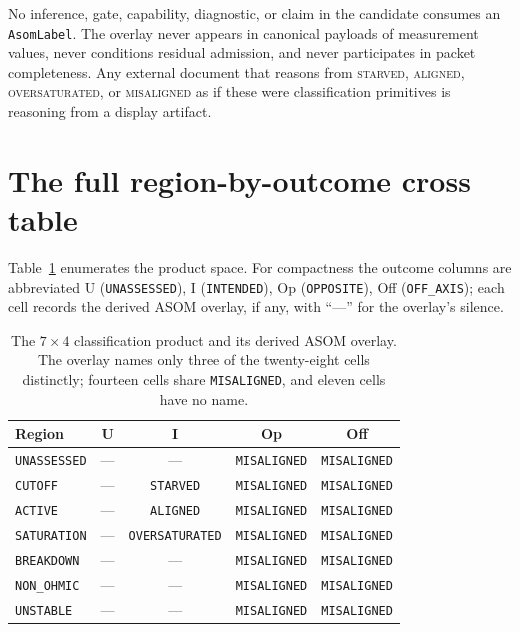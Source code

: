 \begin{ruleenv}\label{ch07:rule:asom-no-identity}
No inference, gate, capability, diagnostic, or claim in the candidate
consumes an \texttt{AsomLabel}. The overlay never appears in canonical
payloads of measurement values, never conditions residual admission, and
never participates in packet completeness. Any external document that
reasons from \textsc{starved}, \textsc{aligned}, \textsc{oversaturated}, or
\textsc{misaligned} as if these were classification primitives is reasoning
from a display artifact.
\end{ruleenv}

\section{The full region-by-outcome cross table}\label{ch07:sec:crosstable}

Table~\ref{ch07:tab:cross} enumerates the product space. For compactness
the outcome columns are abbreviated U (\texttt{UNASSESSED}),
I (\texttt{INTENDED}), Op (\texttt{OPPOSITE}), Off (\texttt{OFF\_AXIS});
each cell records the derived ASOM overlay, if any, with ``---'' for the
overlay's silence.

\begin{table}[htbp]
\centering
\begin{tabular}{@{}lcccc@{}}
\toprule
Region & U & I & Op & Off \\
\midrule
\texttt{UNASSESSED} & --- & --- & \texttt{MISALIGNED} & \texttt{MISALIGNED} \\
\texttt{CUTOFF} & --- & \texttt{STARVED} & \texttt{MISALIGNED} & \texttt{MISALIGNED} \\
\texttt{ACTIVE} & --- & \texttt{ALIGNED} & \texttt{MISALIGNED} & \texttt{MISALIGNED} \\
\texttt{SATURATION} & --- & \texttt{OVERSATURATED} & \texttt{MISALIGNED} & \texttt{MISALIGNED} \\
\texttt{BREAKDOWN} & --- & --- & \texttt{MISALIGNED} & \texttt{MISALIGNED} \\
\texttt{NON\_OHMIC} & --- & --- & \texttt{MISALIGNED} & \texttt{MISALIGNED} \\
\texttt{UNSTABLE} & --- & --- & \texttt{MISALIGNED} & \texttt{MISALIGNED} \\
\bottomrule
\end{tabular}
\caption{The $7 \times 4$ classification product and its derived ASOM
overlay. The overlay names only three of the twenty-eight cells distinctly;
fourteen cells share \texttt{MISALIGNED}, and eleven cells have no name.}
\label{ch07:tab:cross}
\end{table}

